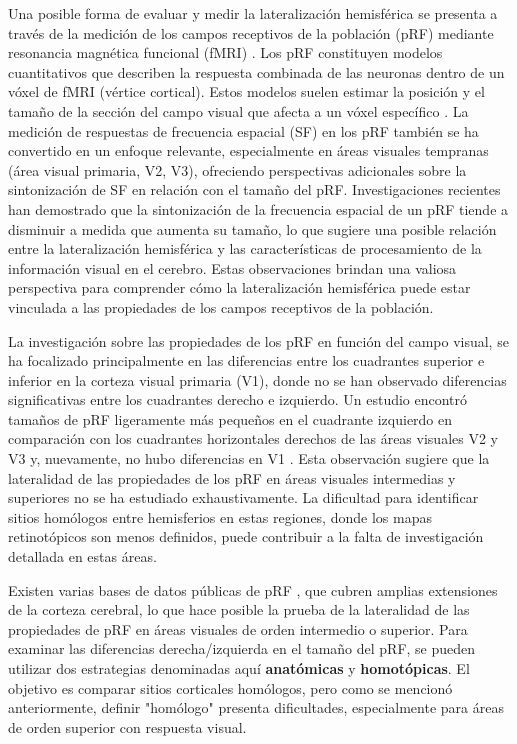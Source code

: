 Una posible forma de evaluar y medir la lateralización hemisférica se presenta a través de la medición de los campos receptivos de la población (pRF) mediante resonancia magnética funcional (fMRI) \cite{dumoulin_population_2008, kay_principles_2018} . Los pRF constituyen modelos cuantitativos que describen la respuesta combinada de las neuronas dentro de un vóxel de fMRI (vértice cortical). Estos modelos suelen estimar la posición y el tamaño de la sección del campo visual que afecta a un vóxel específico \cite{wandell_computational_2015}. La medición de respuestas de frecuencia espacial (SF) en los pRF también se ha convertido en un enfoque relevante, especialmente en áreas visuales tempranas (área visual primaria, V2, V3), ofreciendo perspectivas adicionales sobre la sintonización de SF en relación con el tamaño del pRF. Investigaciones recientes \cite{aghajari_population_2020, broderick_mapping_2022} han demostrado que la sintonización de la frecuencia espacial de un pRF tiende a disminuir a medida que aumenta su tamaño, lo que sugiere una posible relación entre la lateralización hemisférica y las características de procesamiento de la información visual en el cerebro. Estas observaciones brindan una valiosa perspectiva para comprender cómo la lateralización hemisférica puede estar vinculada a las propiedades de los campos receptivos de la población.

La investigación sobre las propiedades de los pRF en funci\'on del campo visual, se ha focalizado principalmente en las diferencias entre los cuadrantes superior e inferior en la corteza visual primaria (V1), donde no se han observado diferencias significativas entre los cuadrantes derecho e izquierdo. Un estudio encontró tamaños de pRF ligeramente más pequeños en el cuadrante izquierdo en comparación con los cuadrantes horizontales derechos de las \'areas visuales V2 y V3 y, nuevamente, no hubo diferencias en V1 \cite{silva_radial_2018}. Esta observación sugiere que la lateralidad de las propiedades de los pRF en áreas visuales intermedias y superiores no se ha estudiado exhaustivamente. La dificultad para identificar sitios homólogos entre hemisferios en estas regiones, donde los mapas retinotópicos son menos definidos, puede contribuir a la falta de investigación detallada en estas áreas.

Existen varias bases de datos p\'ublicas de pRF \cite{benson_bayesian_2018,himmelberg_cross-dataset_2021}, que cubren amplias extensiones de la corteza cerebral, lo que hace posible la prueba de la lateralidad de las propiedades de pRF en \'areas visuales de orden intermedio o superior. Para examinar las diferencias derecha/izquierda en el tamaño del pRF, se pueden utilizar dos estrategias denominadas aquí \textbf{anatómicas} y \textbf{homotópicas}. El objetivo es comparar sitios corticales homólogos, pero como se mencionó anteriormente, definir "homólogo" presenta dificultades, especialmente para áreas de orden superior con respuesta visual.

